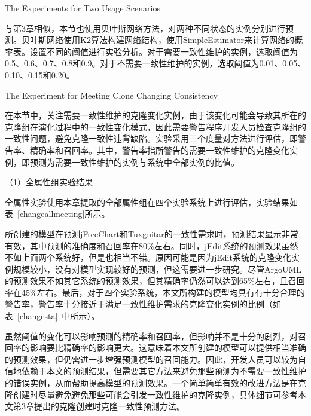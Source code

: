 {The Experiments for Two Usage Scenarios}

与第3章相似，本节也使用贝叶斯网络方法，对两种不同状态的实例分别进行预测。贝叶斯网络使用K2算法构建网络结构，使用SimpleEstimator来计算网络的概率表。设置不同的阈值进行实验分析。对于需要一致性维护的实例，选取阈值为0.5、0.6、0.7、0.8和0.9。对于不需要一致性维护的实例，选取阈值为0.01、0.05、0.10、0.15和0.20。

{The Experiment for Meeting Clone Changing Consistency}

在本节中，关注需要一致性维护的克隆变化实例，由于该变化可能会导致其所在的克隆组在演化过程中的一致性变化模式，因此需要警告程序开发人员检查克隆组的一致性问题，避免克隆一致性违背缺陷。实验采用三个度量对方法进行评估，即警告率、精确率和召回率。其中，警告率指所警告的需要一致性维护的克隆变化实例，即预测为需要一致性维护的实例与系统中全部实例的比值。


（1）全属性组实验结果

全属性实验使用本章提取的全部属性组在四个实验系统上进行评估，实验结果如表~\ref{changeallmeeting}所示。

所创建的模型在预测jFreeChart和Tuxguitar的一致性需求时，预测结果显示非常有效，其中预测的准确度和召回率在80\%左右。同时，jEdit系统的预测效果虽然不如上面两个系统好，但是也相当不错。原因可能是因为jEdit系统的克隆变化实例规模较小，没有对模型实现较好的预测，但这需要进一步研究。尽管ArgoUML的预测效果不如其它系统的预测效果，但其精确率仍然可以达到65\%左右，且召回率在45\%左右。最后，对于四个实验系统，本文所构建的模型均具有有十分合理的警告率，警告率十分接近于满足一致性维护需求的克隆变化实例的比例（如表~\ref {changesta}~中所示）。

虽然阈值的变化可以影响预测的精确率和召回率，但影响并不是十分的剧烈，对召回率的影响要比精确率的影响更大。这意味着本文所创建的模型可以提供相当准确的预测效果，但仍需进一步增强预测模型的召回能力。因此，开发人员可以较为自信地依赖于本文的预测结果，但需要其它方法来避免那些预测为不需要一致性维护的错误实例，从而帮助提高模型的预测效果。一个简单简单有效的改进方法是在克隆创建时尽量避免避免那些可能会引发一致性维护的克隆实例，具体细节可参考本文第3章提出的克隆创建时克隆一致性预测方法。

